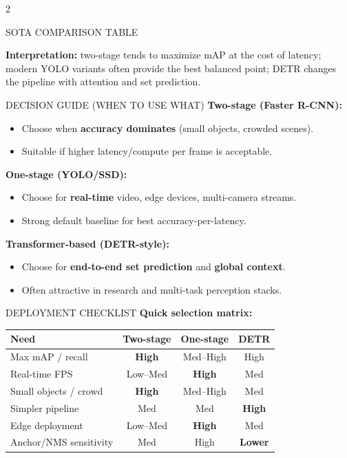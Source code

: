 \documentclass[10pt]{article}
\begin{document}
\begin{multicols}{2}
\begin{sectionbox}{SOTA COMPARISON TABLE}
\vspace{0.8mm}
\raggedright
\scriptsize
\textbf{Interpretation:} two-stage tends to maximize mAP at the cost of latency; modern YOLO variants often provide the best balanced point; DETR changes the pipeline with attention and set prediction.
\end{sectionbox}

\begin{sectionbox}{DECISION GUIDE (WHEN TO USE WHAT)}
\small
\textbf{Two-stage (Faster R-CNN):}
\begin{itemize}
\item Choose when \textbf{accuracy dominates} (small objects, crowded scenes).
\item Suitable if higher latency/compute per frame is acceptable.
\end{itemize}

\textbf{One-stage (YOLO/SSD):}
\begin{itemize}
\item Choose for \textbf{real-time} video, edge devices, multi-camera streams.
\item Strong default baseline for best accuracy-per-latency.
\end{itemize}

\textbf{Transformer-based (DETR-style):}
\begin{itemize}
\item Choose for \textbf{end-to-end set prediction} and \textbf{global context}.
\item Often attractive in research and multi-task perception stacks.
\end{itemize}
\end{sectionbox}

\begin{sectionbox}{DEPLOYMENT CHECKLIST}
\footnotesize
\textbf{Quick selection matrix:}

\vspace{0.8mm}
\centering
\begin{tabular}{lccc}
\toprule
\textbf{Need} & \textbf{Two-stage} & \textbf{One-stage} & \textbf{DETR} \\
\midrule
Max mAP / recall        & \textbf{High} & Med--High & High \\
Real-time FPS           & Low--Med & \textbf{High} & Med \\
Small objects / crowd   & \textbf{High} & Med--High & Med \\
Simpler pipeline        & Med & Med & \textbf{High} \\
Edge deployment         & Low--Med & \textbf{High} & Med \\
Anchor/NMS sensitivity  & Med & High & \textbf{Lower} \\
\bottomrule
\end{tabular}


\end{sectionbox}
\end{multicols}
\end{document}
